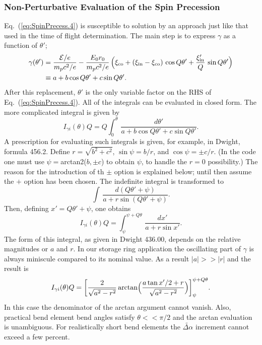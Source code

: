 \documentclass[]{article}
\begin{document}
\subsubsection{Non-Perturbative Evaluation of the Spin Precession}
Eq.~(\ref{eq:SpinPrecess.4}) is susceptible to solution
by an approach just like that used in the time of flight
determination. 
The main step is to express $\gamma$ as a function of $\theta'$;
%
\begin{align}
\gamma(\theta')
 &=
\frac{\mathcal{E}/e}{m_pc^2/e}
 -
\frac{E_0r_0}{m_pc^2/e}\,
\Big(
\xi_{\rm co}
 + 
(\xi_{\rm in}-\xi_{\rm co})\,\cos Q\theta'
 + 
\frac{\xi'_{\rm in}}{Q}\,\sin Q\theta'
\Big) \notag \\
 &\equiv
a + b\cos{Q\theta'} + c\sin{Q\theta'}.
\label{eq:SeriesSpinPrecess.1}
\end{align}
%
After this replacement, $\theta'$ is the only variable factor on 
the RHS of Eq.~(\ref{eq:SpinPrecess.4}). All of the integrals can
be evaluated in closed form. The more complicated integral
is given by
%
\begin{equation}
I_{\gamma i}(\theta)Q
 = 
Q\int_0^{\theta}\,\frac{d\theta'}{a + b\cos{Q\theta'} + c\sin{Q\theta'}}.
\label{eq:SeriesSpinPrecess.2}
\end{equation}
%
A prescription for evaluating such integrals is given, for example,
in Dwight\cite{Dwight}, formula 456.2. Define 
$r=\sqrt{b^2+c^2}$, $\sin\psi=b/r$, and $\cos\psi=\pm c/r$.
(In the code one must use $\psi=$arctan2($b,\pm c$) to obtain $\psi$,
to handle the $r=0$ possibility.) The reason for the introduction of
th $\pm$ option is explained below; until then assume the
$+$ option has been chosen. The indefinite integral is transformed to 
%
\begin{equation}
\int\,\frac{d(Q\theta' + \psi)}{a + r\sin(Q\theta' + \psi)}.
\label{eq:SeriesSpinPrecess.3}
\end{equation}
%
Then, defining $x'=Q\theta' + \psi$, one obtains 
%
\begin{equation}
I_{\gamma i}(\theta)Q
 = 
\int_{ \psi}^{ \psi+Q\theta}\,\frac{dx'}{a + r\sin x'}.
\label{eq:SeriesSpinPrecess.4}
\end{equation}
%
The form of this integral, as given in Dwight 436.00, depends
on the relative magnitudes or $a$ and $r$. In our storage ring
application the oscillating part of $\gamma$ is always miniscule
compared to its nominal value. As a result $|a| >> |r|$ and the
result is
%
\begin{equation}
I_{\gamma i}(\theta)Q
 = 
\bigg[
\frac{2}{\sqrt{a^2-r^2}}\,
{\rm arctan}
\Big(
\frac{a\tan{x'/2} + r}{\sqrt{a^2-r^2}}
\Big)
\bigg]_{ \psi}^{\psi+Q\theta}.
\label{eq:SeriesSpinPrecess.5}
\end{equation}
%
In this case the denominator of the arctan argument cannot vanish.
Also, practical bend element bend angles satisfy $\theta<<\pi/2$
and the arctan evaluation is unambiguous. For realistically short
bend elements the $\widetilde{\Delta\alpha}$ increment cannot exceed a
few percent. 
\end{document}
